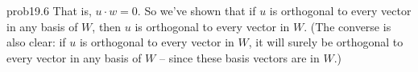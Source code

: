 \begin{sol}{prob19.6}
That is, $u\cdot w=0$. So we've shown that if $u$ is orthogonal to every vector in any basis of $W$, then $u$ is  orthogonal to every vector in $W$. (The converse is also clear: if $u$ is  orthogonal to every vector in $W$, it will surely be orthogonal to every vector in any basis of $W$ -- since these basis vectors are in $W$.)
\medskip

\end{sol}
  
